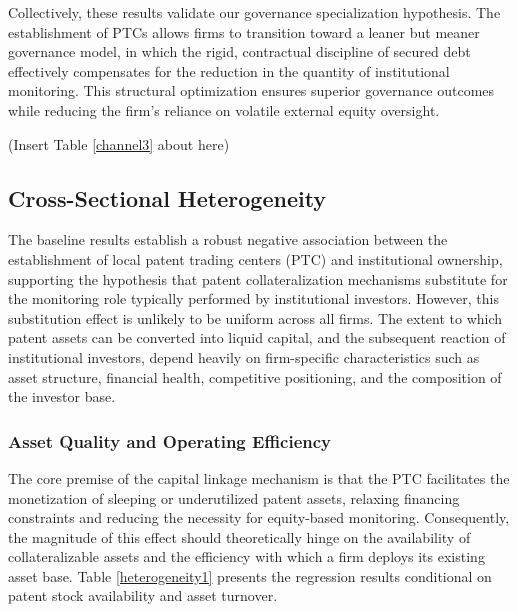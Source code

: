 \documentclass[12pt,a4paper]{article}
\begin{document}
Collectively, these results validate our governance specialization hypothesis. The establishment of PTCs allows firms to transition toward a leaner but meaner governance model, in which the rigid, contractual discipline of secured debt effectively compensates for the reduction in the quantity of institutional monitoring. This structural optimization ensures superior governance outcomes while reducing the firm's reliance on volatile external equity oversight.

\begin{center}
    (Insert Table \ref{channel3} about here)
\end{center}

\subsection{Cross-Sectional Heterogeneity}
The baseline results establish a robust negative association between the establishment of local patent trading centers (PTC) and institutional ownership, supporting the hypothesis that patent collateralization mechanisms substitute for the monitoring role typically performed by institutional investors. However, this substitution effect is unlikely to be uniform across all firms. The extent to which patent assets can be converted into liquid capital, and the subsequent reaction of institutional investors, depend heavily on firm-specific characteristics such as asset structure, financial health, competitive positioning, and the composition of the investor base.

\subsubsection{Asset Quality and Operating Efficiency}
The core premise of the capital linkage mechanism is that the PTC facilitates the monetization of sleeping or underutilized patent assets, relaxing financing constraints and reducing the necessity for equity-based monitoring. Consequently, the magnitude of this effect should theoretically hinge on the availability of collateralizable assets and the efficiency with which a firm deploys its existing asset base. Table \ref{heterogeneity1} presents the regression results conditional on patent stock availability and asset turnover.
\end{document}
